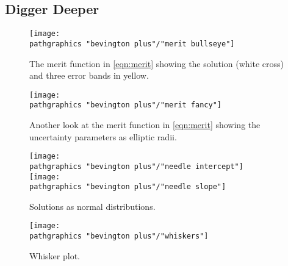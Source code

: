 \subsection{Digger Deeper}  %


\begin{figure}[htbp] %
   \centering
   \texttt{[image: \\pathgraphics "bevington plus"/"merit bullseye"]} 
   \caption[The merit function.]{The merit function in \eqref{eqn:merit} showing the solution (white cross) and three error bands in yellow.}
\end{figure}

\begin{figure}[htbp] %
   \centering
   \texttt{[image: \\pathgraphics "bevington plus"/"merit fancy"]} 
   \caption[Another look at the merit function.]{Another look at the merit function in  \eqref{eqn:merit} showing the uncertainty parameters as elliptic radii.}
\end{figure}

\begin{figure}[htbp] %
   \centering
   \texttt{[image: \\pathgraphics "bevington plus"/"needle intercept"]} \\[30pt]
   \texttt{[image: \\pathgraphics "bevington plus"/"needle slope"]}
   \caption{Solutions as normal distributions.}
\end{figure}

\begin{figure}[htbp] %
   \centering
   \texttt{[image: \\pathgraphics "bevington plus"/"whiskers"]} 
   \caption[Whisker plot.]{Whisker plot.}
\end{figure}

\endinput